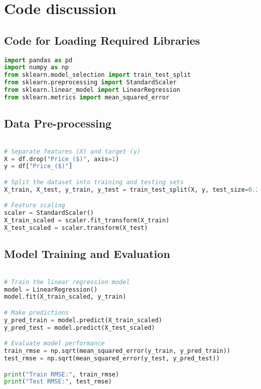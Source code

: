 \documentclass{article}
\begin{document}
\section{Code discussion}

\subsection{Code for Loading Required Libraries}
\begin{lstlisting}[language=Python, caption=Libraries used]
import pandas as pd
import numpy as np
from sklearn.model_selection import train_test_split
from sklearn.preprocessing import StandardScaler
from sklearn.linear_model import LinearRegression
from sklearn.metrics import mean_squared_error
\end{lstlisting}

\subsection{Data Pre-processing}
\begin{lstlisting}[language=Python, caption=Data preprocessing]

# Separate features (X) and target (y)
X = df.drop("Price_($)", axis=1)
y = df["Price_($)"]

# Split the dataset into training and testing sets
X_train, X_test, y_train, y_test = train_test_split(X, y, test_size=0.2, random_state=42)

# Feature scaling
scaler = StandardScaler()
X_train_scaled = scaler.fit_transform(X_train)
X_test_scaled = scaler.transform(X_test)
\end{lstlisting}
\subsection{Model Training and Evaluation}
\begin{lstlisting}[language=Python, caption=Model training and evaluation]

# Train the linear regression model
model = LinearRegression()
model.fit(X_train_scaled, y_train)

# Make predictions
y_pred_train = model.predict(X_train_scaled)
y_pred_test = model.predict(X_test_scaled)

# Evaluate model performance
train_rmse = np.sqrt(mean_squared_error(y_train, y_pred_train))
test_rmse = np.sqrt(mean_squared_error(y_test, y_pred_test))

print("Train RMSE:", train_rmse)
print("Test RMSE:", test_rmse)
\end{lstlisting}
\end{document}

